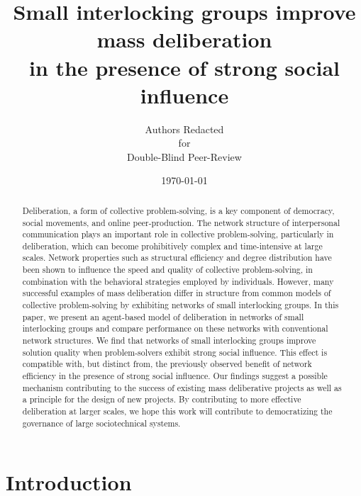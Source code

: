 \documentclass[twocolumn,10pt]{article}
\title{Small interlocking groups improve mass deliberation\\in the presence of strong social influence}
\author{
Authors Redacted \\
for \\
Double-Blind Peer-Review
}
\date{\today}
\begin{document}
\maketitle
\begin{abstract}
Deliberation, a form of collective problem-solving, is a key component of democracy, social movements, and online peer-production.
The network structure of interpersonal communication plays an important role in collective problem-solving, particularly in deliberation, which can become prohibitively complex and time-intensive at large scales.
Network properties such as structural efficiency and degree distribution have been shown to influence the speed and quality of collective problem-solving, in combination with the behavioral strategies employed by individuals.
However, many successful examples of mass deliberation differ in structure from common models of collective problem-solving by exhibiting networks of small interlocking groups.
In this paper, we present an agent-based model of deliberation in networks of small interlocking groups and compare performance on these networks with conventional network structures.
We find that networks of small interlocking groups improve solution quality when problem-solvers exhibit strong social influence.
This effect is compatible with, but distinct from, the previously observed benefit of network efficiency in the presence of strong social influence.
Our findings suggest a possible mechanism contributing to the success of existing mass deliberative projects as well as a principle for the design of new projects.
By contributing to more effective deliberation at larger scales, we hope this work will contribute to democratizing the governance of large sociotechnical systems.

\end{abstract}

\section{Introduction}
\end{document}
